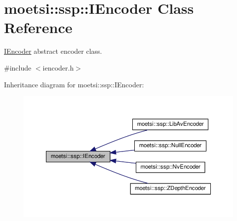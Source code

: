 \hypertarget{classmoetsi_1_1ssp_1_1IEncoder}{}\section{moetsi\+:\+:ssp\+:\+:I\+Encoder Class Reference}
\label{classmoetsi_1_1ssp_1_1IEncoder}


\hyperlink{classmoetsi_1_1ssp_1_1IEncoder}{I\+Encoder} abstract encoder class.  




{\ttfamily \#include $<$iencoder.\+h$>$}



Inheritance diagram for moetsi\+:\+:ssp\+:\+:I\+Encoder\+:
\nopagebreak
\begin{figure}[H]
\begin{center}
\leavevmode
\includegraphics[width=350pt]{classmoetsi_1_1ssp_1_1IEncoder__inherit__graph}
\end{center}
\end{figure}

